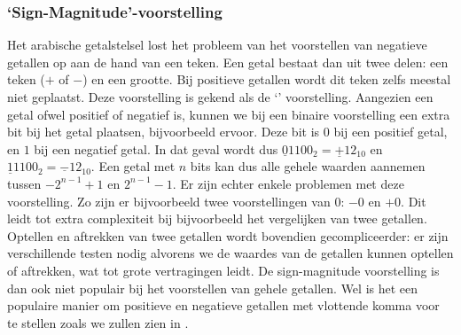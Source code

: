 \subsubsection{`Sign-Magnitude'-voorstelling}
Het arabische getalstelsel lost het probleem van het voorstellen van negatieve getallen op aan de hand van een teken. Een getal bestaat dan uit twee delen: een teken ($+$ of $-$) en een grootte. Bij positieve getallen wordt dit teken zelfs meestal niet geplaatst. Deze voorstelling is gekend als de `' voorstelling. Aangezien een getal ofwel positief of negatief is, kunnen we bij een binaire voorstelling een extra bit bij het getal plaatsen, bijvoorbeeld ervoor. Deze bit is $0$ bij een positief getal, en $1$ bij een negatief getal. In dat geval wordt dus $\underline{0}1100_2=\underline{+}12_{10}$ en $\underline{1}1100_2=\underline{-}12_{10}$. Een getal met $n$ bits kan dus alle gehele waarden aannemen tussen $-2^{n-1}+1$ en $2^{n-1}-1$. Er zijn echter enkele problemen met deze voorstelling. Zo zijn er bijvoorbeeld twee voorstellingen van $0$: $-0$ en $+0$. Dit leidt tot extra complexiteit bij bijvoorbeeld het vergelijken van twee getallen. Optellen en aftrekken van twee getallen wordt bovendien gecompliceerder: er zijn verschillende testen nodig alvorens we de waardes van de getallen kunnen optellen of aftrekken, wat tot grote vertragingen leidt. De sign-magnitude voorstelling is dan ook niet populair bij het voorstellen van gehele getallen. Wel is het een populaire manier om positieve en negatieve getallen met vlottende komma voor te stellen zoals we zullen zien in .

